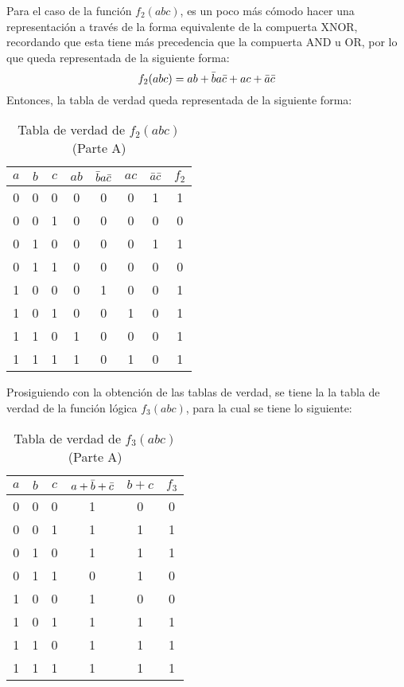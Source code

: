 \documentclass[../procedimientos.tex]{subfiles}
\begin{document}
Para el caso de la función $f_2(abc)$, es un poco más cómodo hacer una 
representación a través de la forma equivalente de la compuerta XNOR, 
recordando que esta tiene más precedencia que la compuerta AND u OR, por lo 
que queda representada de la siguiente forma:
$$f_2(abc) = ab + \bar{b}a\bar{c} + ac + \bar{a}\bar{c}$$
Entonces, la tabla de verdad queda representada de la siguiente forma:
\begin{table}[H]
  \centering
  \begin{tabular}{ccc|cccc|c}
    \hline
    $a$ & $b$ & $c$ & $ab$ & $\bar{b}a\bar{c}$ & $ac$ & $\bar{a}\bar{c}$ & $f_2$\\
    \hline
    0 & 0 & 0 & 0 & 0 & 0 & 1 & 1\\
    0 & 0 & 1 & 0 & 0 & 0 & 0 & 0\\
    0 & 1 & 0 & 0 & 0 & 0 & 1 & 1\\
    0 & 1 & 1 & 0 & 0 & 0 & 0 & 0\\
    1 & 0 & 0 & 0 & 1 & 0 & 0 & 1\\
    1 & 0 & 1 & 0 & 0 & 1 & 0 & 1\\
    1 & 1 & 0 & 1 & 0 & 0 & 0 & 1\\
    1 & 1 & 1 & 1 & 0 & 1 & 0 & 1\\
    \hline
  \end{tabular}
  \caption{Tabla de verdad de $f_2(abc)$ (Parte A)}
  \label{tab:a_f2}
\end{table}

Prosiguiendo con la obtención de las tablas de verdad, se tiene la la tabla de 
verdad de la función lógica $f_3(abc)$, para la cual se tiene lo siguiente:
\begin{table}[H]
  \centering
  \begin{tabular}{ccc|cc|c}
    \hline
    $a$ & $b$ & $c$ & $a + \bar{b} + \bar{c}$ & $b + c$ & $f_3$\\
    \hline
    0 & 0 & 0 & 1 & 0 & 0\\
    0 & 0 & 1 & 1 & 1 & 1\\
    0 & 1 & 0 & 1 & 1 & 1\\
    0 & 1 & 1 & 0 & 1 & 0\\
    1 & 0 & 0 & 1 & 0 & 0\\
    1 & 0 & 1 & 1 & 1 & 1\\
    1 & 1 & 0 & 1 & 1 & 1\\
    1 & 1 & 1 & 1 & 1 & 1\\
    \hline
  \end{tabular}
  \caption{Tabla de verdad de $f_3(abc)$ (Parte A)}
  \label{tab:a_f3}
\end{table}
\end{document}
